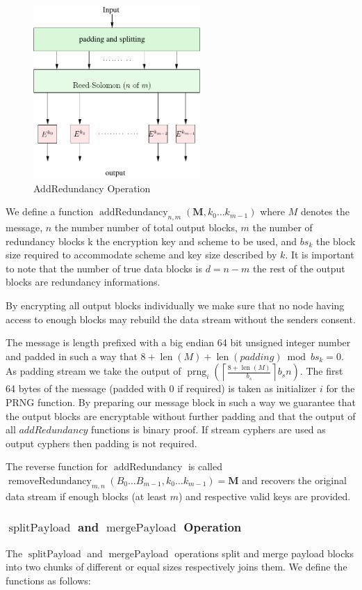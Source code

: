 \documentclass[9pt,journal,compsoc]{IEEEtran}
\DeclareMathOperator{\prng}{prng}
\DeclareMathOperator{\len}{len}
\DeclareMathOperator{\splitPayload}{splitPayload}
\DeclareMathOperator{\mergePayload}{mergePayload}
\DeclareMathOperator{\addRedundancy}{addRedundancy}
\DeclareMathOperator{\removeRedundancy}{removeRedundancy}
\begin{document}
\begin{figure}[!t]
	\centering
	\includegraphics[width=2.5in]{../inc/addRedundancyOp}
	\caption{AddRedundancy Operation}
	\label{fig:addRedundancy}
\end{figure}

We define a function $\addRedundancy_{n,m}( \mathbf{M},k_0\ldots k_{m-1} )$ where $M$ denotes the message, $n$ the number number of total output blocks, $m$ the number of redundancy blocks k the encryption key and scheme to be used, and $bs_k$ the block size required to accommodate scheme and key size described by $k$. It is important to note that the number of true data blocks is $d=n-m$ the rest of the output blocks are redundancy informations.

By encrypting all output blocks individually we make sure that no node having access to enough blocks may rebuild the data stream without the senders consent.

The message is length prefixed with a big endian 64 bit unsigned integer number and padded in such a way that $8+\len(M)+\len(padding) \bmod bs_k =0$. As padding stream we take the output of $\prng_i\left(\left\lceil\frac{8+\len(M)}{b_s}\right\rceil b_s n\right )$. The first 64 bytes of the message (padded with 0 if required) is taken as initializer $i$ for the PRNG function. By preparing our message block in such a way we guarantee that the output blocks are encryptable without further padding and that the output of all $addRedundancy$ functions is binary proof. If stream cyphers are used as output cyphers then padding is not required.

The reverse function for $\addRedundancy$ is called $\removeRedundancy_{m,n}(B_0\ldots B_{m-1},k_0\ldots k_{m-1})=\mathbf{M}$ and recovers the original data stream if enough blocks (at least $m$) and respective valid keys are provided. 

\subsubsection{$\splitPayload$ and $\mergePayload$ Operation}
The $\splitPayload$ and $\mergePayload$ operations split and merge payload blocks into two chunks of different or equal sizes respectively joins them. We define the functions as follows:
\end{document}
